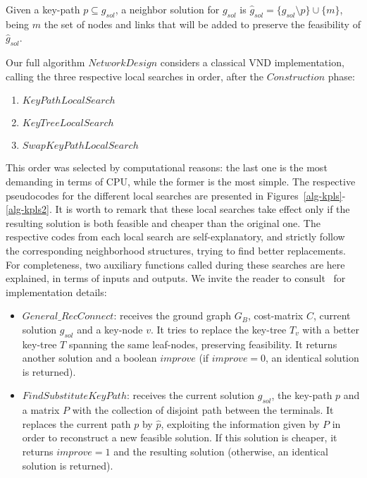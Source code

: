 \documentclass{llncs}
\begin{document}
\begin{definition}
Given a key-path $p \subseteq g_{sol}$, a neighbor solution for $g_{sol}$ is 
$\hat{g}_{sol} = \{ g_{sol}\setminus p \}\cup \{m\}$, 
being $m$ the set of nodes and links that will be added to preserve the feasibility of ${\hat{g}}_{sol}$.  
\end{definition}

Our full algorithm $NetworkDesign$ considers a classical VND implementation, calling the three respective local searches in order, after the $Construction$ phase:
\begin{enumerate}
\item $KeyPathLocalSearch$
\item $KeyTreeLocalSearch$
\item $SwapKeyPathLocalSearch$
\end{enumerate}
This order was selected by computational reasons: the last one is the most demanding in terms of CPU, while the former 
is the most simple. The respective pseudocodes for the different local searches are presented in Figures~\ref{alg-kpls}-\ref{alg-kpls2}. It is worth to remark that these local searches take effect only if the resulting solution is both feasible and cheaper than the original one. The respective codes from each local search are self-explanatory, and strictly follow  the corresponding neighborhood structures, trying to find better replacements. For completeness, two auxiliary functions 
called during these searches are here explained, in terms of inputs and outputs. 
We invite the reader to consult~\cite{117} for implementation details:
\begin{itemize}
\item $General\_RecConnect$: receives the ground graph $G_B$, cost-matrix $C$, current solution $g_{sol}$ and a 
key-node $v$. It tries to replace the key-tree $T_v$ with a better key-tree $T$ spanning the same leaf-nodes, preserving feasibility. It returns another solution and a boolean $improve$ (if $improve=0$, an identical solution is returned).
\item $FindSubstituteKeyPath$: receives the current solution $g_{sol}$, the key-path $p$ and a matrix $P$ with the 
collection of disjoint path between the terminals. It replaces the current path $p$ by $\hat{p}$, exploiting the information given by $P$ in order to reconstruct a new feasible solution. If this solution is cheaper, it returns $improve=1$ 
and the resulting solution (otherwise, an identical solution is returned). 
\end{itemize}
\end{document}
